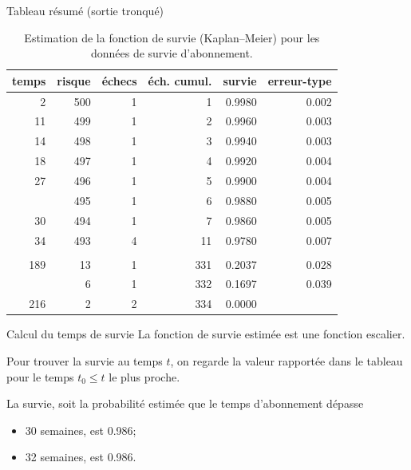 \documentclass[
  ignorenonframetext,
]{beamer}
\providecommand{\tightlist}{%
  \setlength{\itemsep}{0pt}\setlength{\parskip}{0pt}}
\begin{document}
\begin{frame}{Tableau résumé (sortie tronqué)}
\protect{}\label{tableau-ruxe9sumuxe9-sortie-tronquuxe9}
\begin{longtable}[t]{rrrrrr}

\caption{\label{tbl-survie1-tableau}Estimation de la fonction de survie
(Kaplan--Meier) pour les données de survie d'abonnement.}

\tabularnewline

\toprule
temps & risque & échecs & éch. cumul. & survie & erreur-type\\
\midrule
2 & 500 & 1 & 1 & 0.9980 & 0.002\\
11 & 499 & 1 & 2 & 0.9960 & 0.003\\
14 & 498 & 1 & 3 & 0.9940 & 0.003\\
18 & 497 & 1 & 4 & 0.9920 & 0.004\\
27 & 496 & 1 & 5 & 0.9900 & 0.004\\
\addlinespace
29 & 495 & 1 & 6 & 0.9880 & 0.005\\
30 & 494 & 1 & 7 & 0.9860 & 0.005\\
34 & 493 & 4 & 11 & 0.9780 & 0.007\\
 &  &  &  &  & \\
189 & 13 & 1 & 331 & 0.2037 & 0.028\\
\addlinespace
202 & 6 & 1 & 332 & 0.1697 & 0.039\\
216 & 2 & 2 & 334 & 0.0000 & \\
\bottomrule

\end{longtable}
\end{frame}

\begin{frame}{Calcul du temps de survie}
\protect{}\label{calcul-du-temps-de-survie}
La fonction de survie estimée est une fonction escalier.

Pour trouver la survie au temps \(t\), on regarde la valeur rapportée
dans le tableau pour le temps \(t_0 \leq t\) le plus proche.

La survie, soit la probabilité estimée que le temps d'abonnement dépasse

\begin{itemize}
\tightlist
\item
  30 semaines, est 0.986;
\item
  32 semaines, est 0.986.
\end{itemize}
\end{frame}
\end{document}
